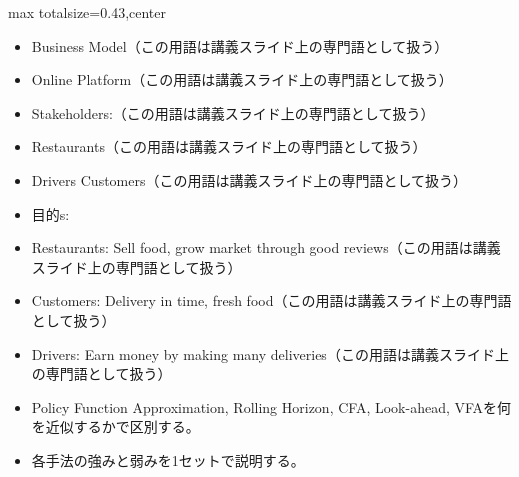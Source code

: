 \clearpage
{}
\begin{minipage}[t]{0.405\textwidth}
\begin{adjustbox}{max totalsize={\textwidth}{0.43\textheight},center}
\begin{minipage}{\textwidth}\scriptsize
{}\begin{itemize}
\item Business Model（この用語は講義スライド上の専門語として扱う）
\item Online Platform（この用語は講義スライド上の専門語として扱う）
\item Stakeholders:（この用語は講義スライド上の専門語として扱う）
\item Restaurants（この用語は講義スライド上の専門語として扱う）
\item Drivers Customers（この用語は講義スライド上の専門語として扱う）
\item 目的s:
\item Restaurants: Sell food, grow market through good reviews（この用語は講義スライド上の専門語として扱う）
\item Customers: Delivery in time, fresh food（この用語は講義スライド上の専門語として扱う）
\item Drivers: Earn money by making many deliveries（この用語は講義スライド上の専門語として扱う）
\end{itemize}\begin{itemize}
\item Policy Function Approximation, Rolling Horizon, CFA, Look-ahead, VFAを何を近似するかで区別する。
\item 各手法の強みと弱みを1セットで説明する。
\end{itemize}
\end{minipage}
\end{adjustbox}
\end{minipage}\hfill
